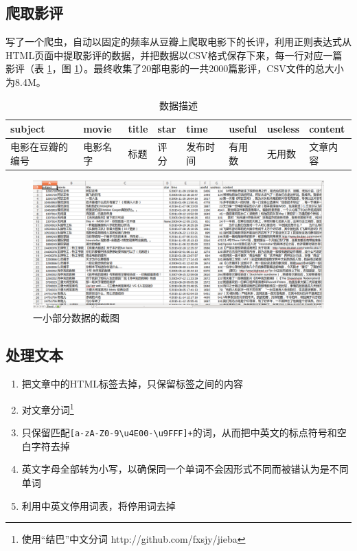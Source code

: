 \documentclass[a4paper, nofonts, nocap]{ctexart}
\begin{document}
\subsection{爬取影评}
写了一个爬虫，自动以固定的频率从豆瓣上爬取电影下的长评，利用正则表达式从HTML页面中提取影评的数据，并把数据以CSV格式保存下来，每一行对应一篇影评（表 \ref{table:data}，图 \ref{fig:data}）。最终收集了20部电影的一共2000篇影评，CSV文件的总大小为8.4M。

\begin{table}[ht]
	\centering
	\begin{tabular}{llllllll}
		\toprule
		subject & movie & title & star & time & useful & useless & content \\
		\midrule
		电影在豆瓣的编号 & 电影名字 & 标题 & 评分 & 发布时间 & 有用数 & 无用数 & 文章内容 \\
		\bottomrule
	\end{tabular}
	\caption{数据描述}
	\label{table:data}
\end{table}

\begin{figure}[ht]
	\centering
	\includegraphics[width=\textwidth]{images/data.png}
	\caption{一小部分数据的截图}
	\label{fig:data}
\end{figure}

\subsection{处理文本}
\begin{enumerate}
	\item 把文章中的HTML标签去掉，只保留标签之间的内容
	\item 对文章分词\footnote{使用“结巴”中文分词 http://github.com/fxsjy/jieba}
	\item 只保留匹配\verb|[a-zA-Z0-9\u4E00-\u9FFF]+|的词，从而把中英文的标点符号和空白字符去掉
	\item 英文字母全部转为小写，以确保同一个单词不会因形式不同而被错认为是不同单词
	\item 利用中英文停用词表，将停用词去掉
\end{enumerate}
\end{document}
